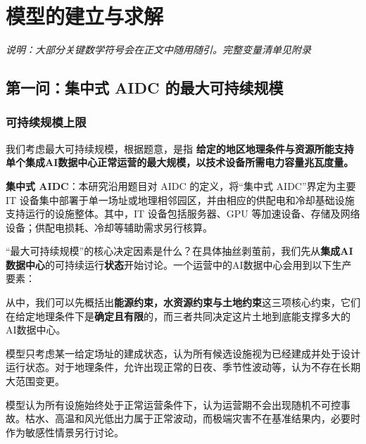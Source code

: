 ﻿%
\section{模型的建立与求解}\label{sec:model}

\textit{说明：大部分关键数学符号会在正文中随用随引。完整变量清单见附录}

\subsection{第一问：集中式 AIDC 的最大可持续规模}\label{sec:q1}

\subsubsection{可持续规模上限}\label{sec:scale}

我们考虑最大可持续规模，根据题意，是指 \textbf{给定的地区地理条件与资源所能支持单个集成AI数据中心正常运营的最大规模，以技术设备所需电力容量兆瓦度量。}

\begin{noteblock}
\textbf{集中式 AIDC}：本研究沿用题目对 AIDC 的定义，将“集中式 AIDC”界定为主要 IT 设备集中部署于单一场址或地理相邻园区，并由相应的供配电和冷却基础设施支持运行的设施整体。其中，IT 设备包括服务器、GPU 等加速设备、存储及网络设备；供配电损耗、冷却等辅助需求另行核算。
\end{noteblock}

“最大可持续规模”的核心决定因素是什么？在具体抽丝剥茧前，我们先从\textbf{集成AI数据中心}的可持续运行\textbf{状态}开始讨论。一个运营中的AI数据中心会用到以下生产要素：

从中，我们可以先概括出\textbf{能源约束，水资源约束与土地约束}这三项核心约束，它们在给定地理条件下是\textbf{确定且有限}的，而三者共同决定这片土地到底能支撑多大的AI数据中心。

\begin{asum}[固定场址与建成配置]\label{asum:fixed}
模型只考虑某一给定场址的建成状态，认为所有候选设施视为已经建成并处于设计运行状态。对于地理条件，允许出现正常的日夜、季节性波动等，认为不存在长期大范围变更。
\end{asum}

\begin{asum}[正常运营]\label{asum:normal}
模型认为所有设施始终处于正常运营条件下，认为运营期不会出现随机不可控事故。枯水、高温和风光低出力属于正常波动，而极端灾害不在基准结果内，必要时作为敏感性情景另行讨论。
\end{asum}

